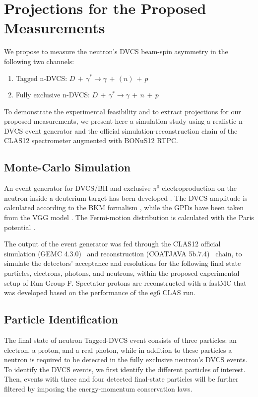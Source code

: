 \chapter{Projections for the Proposed Measurements}
\label{chap:reach}
We propose to measure the neutron's DVCS beam-spin asymmetry in the following 
two channels:
\begin{enumerate}
   \item Tagged n-DVCS: $D\,+\,\gamma^{*}  \longrightarrow 
      \gamma\,+\,(n)\,+\,p$
   \item Fully exclusive n-DVCS: $D\,+\,\gamma^{*}  \longrightarrow \gamma\,+\, 
      n \,+\,p$
\end{enumerate}

To demonstrate the experimental feasibility and to extract projections for our 
proposed measurements, we present here a simulation study using a realistic 
n-DVCS event generator and the official simulation-reconstruction chain of the 
CLAS12 spectrometer augmented with BONuS12 RTPC. 


\section{Monte-Carlo Simulation}
An event generator for DVCS/BH and exclusive $\pi^0$ electroproduction on the 
neutron inside a deuterium target has been developed \cite{ahmed}. The DVCS 
amplitude is calculated according to the BKM formalism \cite{Belitsky:2001ns}, 
while the GPDs have been taken from the VGG model 
\cite{PhysRevD.60.094017,Guidal:2004nd}. The Fermi-motion distribution is 
calculated with the Paris potential \cite{PhysRevC.21.861}.

The output of the event generator was fed through the  CLAS12 official 
simulation (GEMC 4.3.0)~\cite{clas12-gemc} and reconstruction (COATJAVA 
5b.7.4)~\cite{clas12-coatjava} chain, to simulate the detectors' acceptance and 
resolutions for the following final state particles, electrons, photons, and 
neutrons, within the proposed experimental setup of Run Group F. Spectator 
protons are reconstructed with a fastMC that was developed based on the 
performance of the eg6 CLAS run.

\section{Particle Identification}

The final state of neutron Tagged-DVCS event consists of three particles: an 
electron, a proton, and a real photon, while in addition to these particles a 
neutron is required to be detected in the fully exclusive neutron's DVCS 
events. To identify the DVCS events, we first identify the different particles 
of interest. Then, events with three and four detected final-state particles 
will be further filtered by imposing the energy-momentum conservation laws.

